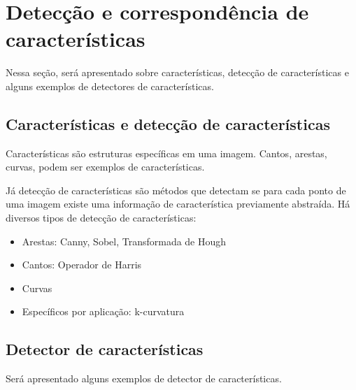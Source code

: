 \documentclass{article}
\begin{document}
\section{Detecção e correspondência de características}
\label{sec:detecção}
Nessa seção, será apresentado sobre características, detecção de características e alguns exemplos de detectores de características.
\subsection{Características e detecção de características}
Características são estruturas específicas em uma imagem. Cantos, arestas, curvas, podem ser exemplos de características.
\par Já detecção de características são métodos que detectam se para cada ponto de uma imagem existe uma informação de característica previamente abstraída.
Há diversos tipos de detecção de características:
\begin{itemize}
    \item Arestas: Canny, Sobel, Transformada de Hough
    \item Cantos: Operador de Harris
    \item Curvas
    \item Específicos por aplicação: k-curvatura
\end{itemize}

\subsection{Detector de características}
Será apresentado alguns exemplos de detector de características.
\end{document}
